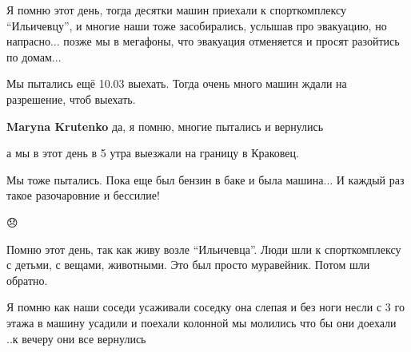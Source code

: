  
 
 
 
 

\qqSecCmt


Я помню этот день, тогда десятки машин приехали к спорткомплексу \enquote{Ильичевцу}, и
многие наши тоже засобирались, услышав про эвакуацию, но напрасно... позже мы в
мегафоны, что эвакуация отменяется и просят разойтись по домам...


Мы пытались ещё 10.03 выехать. Тогда очень много машин ждали на разрешение, чтоб выехать.

\begin{itemize} %
\textbf{Maryna Krutenko} да, я помню, многие пытались и вернулись
\end{itemize} %


а мы в этот день в 5 утра выезжали на границу в Краковец.


Мы тоже пытались. Пока еще был бензин в баке и была машина... И каждый раз
такое разочаровние и бессилие!


😞


Помню этот день, так как живу возле \enquote{Ильичевца}. Люди шли к спорткомплексу с
детьми, с вещами, животными. Это был просто муравейник. Потом шли обратно.


Я помню как наши соседи усаживали соседку она слепая и без ноги несли с 3 го
этажа в машину усадили и поехали колонной мы молились что бы они доехали ..к
вечеру они все вернулись
